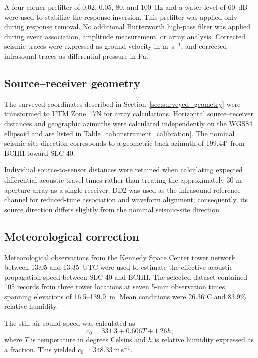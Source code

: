 \documentclass[]{seismica}
\begin{document}
A four-corner prefilter of 0.02, 0.05, 80, and 100~Hz and a water level of
60~dB were used to stabilize the response inversion. This prefilter was applied
only during response removal. No additional Butterworth high-pass filter was
applied during event association, amplitude measurement, or array analysis.
Corrected seismic traces were expressed as ground velocity in
m~s$^{-1}$, and corrected infrasound traces as differential pressure in Pa.


\subsection{Source--receiver geometry}

The surveyed coordinates described in
Section~\ref{sec:surveyed_geometry} were transformed
to UTM Zone~17N for array calculations. Horizontal source--receiver distances
and geographic azimuths were calculated independently on the WGS84 ellipsoid
and are listed in Table~\ref{tab:instrument_calibration}. The nominal
seismic-site direction corresponds to a geometric back azimuth of
199.44$^\circ$ from BCHH toward SLC-40.

Individual source-to-sensor distances were retained when calculating expected
differential acoustic travel times rather than treating the approximately
30-m-aperture array as a single receiver. DD2 was used as the infrasound
reference channel for reduced-time association and waveform alignment;
consequently, its source direction differs slightly from the nominal
seismic-site direction.

\subsection{Meteorological correction}

Meteorological observations from the Kennedy Space Center tower network between
13:05 and 13:35~UTC were used to estimate the effective acoustic propagation
speed between SLC-40 and BCHH. The selected dataset contained 105 records from
three tower locations at seven 5-min observation times, spanning elevations of
16.5--139.9~m. Mean conditions were 26.36$^\circ$C and 83.9\% relative
humidity.

The still-air sound speed was calculated as
\begin{equation}
  c_0 = 331.3 + 0.606T + 1.26h,
  \label{eq:sound_speed}
\end{equation}
where $T$ is temperature in degrees Celsius and $h$ is relative humidity
expressed as a fraction. This yielded
$c_0=348.33~\mathrm{m\,s^{-1}}$.
\end{document}
